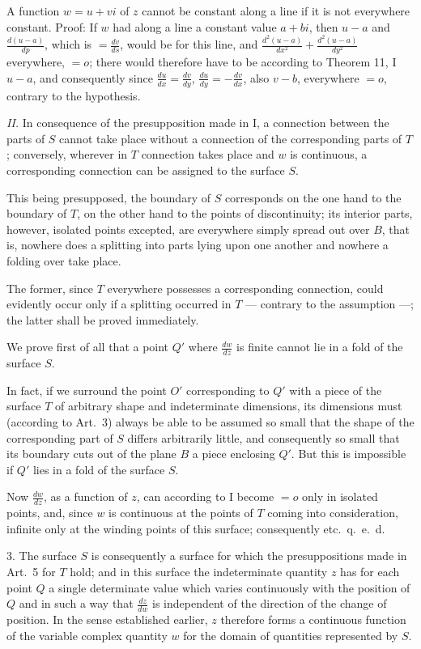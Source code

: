 \documentclass{article}
\begin{document}
A function $w = u + vi$ of $z$ cannot be constant along a line if it is not everywhere constant. Proof: If $w$ had along a line a constant value $a + bi$, then $u - a$ and $\frac{d(u - a)}{dp}$, which is $= \frac{dv}{ds}$, would be for this line, and $\frac{d^2(u - a)}{dx^2} + \frac{d^2(u - a)}{dy^2}$ everywhere, $= o$; there would therefore have to be according to Theorem 11, I $u - a$, and consequently since $\frac{du}{dx} = \frac{dv}{dy}$, $\frac{du}{dy} = -\frac{dv}{dx}$, also $v - b$, everywhere $= o$, contrary to the hypothesis.

\emph{II.} In consequence of the presupposition made in I, a connection between the parts of $S$ cannot take place without a connection of the corresponding parts of $T$; conversely, wherever in $T$ connection takes place and $w$ is continuous, a corresponding connection can be assigned to the surface $S$.

This being presupposed, the boundary of $S$ corresponds on the one hand to the boundary of $T$, on the other hand to the points of discontinuity; its interior parts, however, isolated points excepted, are everywhere simply spread out over $B$, that is, nowhere does a splitting into parts lying upon one another and nowhere a folding over take place.

The former, since $T$ everywhere possesses a corresponding connection, could evidently occur only if a splitting occurred in $T$ --- contrary to the assumption ---; the latter shall be proved immediately.

We prove first of all that a point $Q'$ where $\frac{dw}{dz}$ is finite cannot lie in a fold of the surface $S$.

In fact, if we surround the point $O'$ corresponding to $Q'$ with a piece of the surface $T$ of arbitrary shape and indeterminate dimensions, its dimensions must (according to Art.~3) always be able to be assumed so small that the shape of the corresponding part of $S$ differs arbitrarily little, and consequently so small that its boundary cuts out of the plane $B$ a piece enclosing $Q'$. But this is impossible if $Q'$ lies in a fold of the surface $S$.

Now $\frac{dw}{dz}$, as a function of $z$, can according to I become $= o$ only in isolated points, and, since $w$ is continuous at the points of $T$ coming into consideration, infinite only at the winding points of this surface; consequently etc.\ q.\ e.\ d.

3. The surface $S$ is consequently a surface for which the presuppositions made in Art.~5 for $T$ hold; and in this surface the indeterminate quantity $z$ has for each point $Q$ a single determinate value which varies continuously with the position of $Q$ and in such a way that $\frac{dz}{dw}$ is independent of the direction of the change of position. In the sense established earlier, $z$ therefore forms a continuous function of the variable complex quantity $w$ for the domain of quantities represented by $S$.
\end{document}
